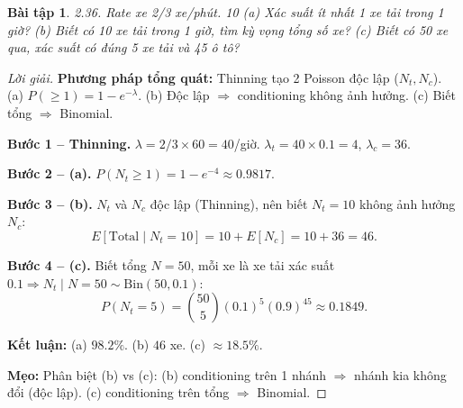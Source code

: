 \documentclass[8pt,a4paper]{article}
\newtheorem{exercise}{Bài tập}
\newenvironment{solution}{\begin{proof}[Lời giải]}{\end{proof}}
\begin{document}
\begin{exercise}
2.36. Rate xe 2/3 xe/phút. 10%
(a) Xác suất ít nhất 1 xe tải trong 1 giờ?
(b) Biết có 10 xe tải trong 1 giờ, tìm kỳ vọng tổng số xe?
(c) Biết có 50 xe qua, xác suất có đúng 5 xe tải và 45 ô tô?
\end{exercise}
\begin{solution}
\textbf{Phương pháp tổng quát:} Thinning tạo 2 Poisson độc lập ($N_t, N_c$). (a) $P(\geq 1) = 1-e^{-\lambda}$. (b) Độc lập $\Rightarrow$ conditioning không ảnh hưởng. (c) Biết tổng $\Rightarrow$ Binomial.

\textbf{Bước 1 -- Thinning.} $\lambda = 2/3 \times 60 = 40$/giờ. $\lambda_t = 40 \times 0.1 = 4$, $\lambda_c = 36$.

\textbf{Bước 2 -- (a).} $P(N_t \geq 1) = 1 - e^{-4} \approx \boxed{0.9817}$.

\textbf{Bước 3 -- (b).} $N_t$ và $N_c$ độc lập (Thinning), nên biết $N_t = 10$ không ảnh hưởng $N_c$:
\[
  E[\text{Total} \mid N_t = 10] = 10 + E[N_c] = 10 + 36 = \boxed{46}.
\]

\textbf{Bước 4 -- (c).} Biết tổng $N = 50$, mỗi xe là xe tải xác suất $0.1 \Rightarrow N_t \mid N = 50 \sim \text{Bin}(50, 0.1)$:
\[
  P(N_t = 5) = \binom{50}{5}(0.1)^5(0.9)^{45} \approx \boxed{0.1849}.
\]

\textbf{Kết luận:} (a) $98.2\%$. (b) $46$ xe. (c) $\approx 18.5\%$.

\textbf{Mẹo:} Phân biệt (b) vs (c): (b) conditioning trên 1 nhánh $\Rightarrow$ nhánh kia không đổi (độc lập). (c) conditioning trên tổng $\Rightarrow$ Binomial.
\end{solution}
\end{document}
